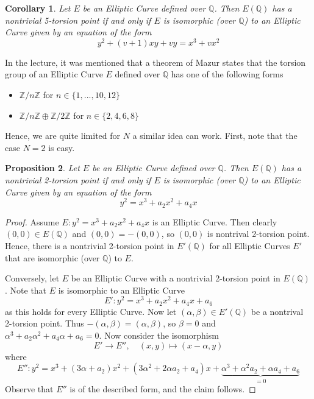 \documentclass{scrartcl}
\newcommand{\Z}{\mathbb{Z}}
\newcommand{\Q}{\mathbb{Q}}
\newtheorem{prop}{Proposition}
\newtheorem{corollary}[prop]{Corollary}
\theoremstyle{definition}
\begin{document}
\begin{corollary}
    Let $E$ be an Elliptic Curve defined over $\Q$.
    Then $E(\Q)$ has a nontrivial 5-torsion point if and only if $E$ is isomorphic (over $\Q$) to an Elliptic Curve given by an equation of the form
    \begin{equation*}
        y^2 + (v + 1)x y + v y = x^3 + v x^2
    \end{equation*}
\end{corollary}
In the lecture, it was mentioned that a theorem of Mazur states that the torsion group of an Elliptic Curve $E$ defined over $\Q$ has one of the following forms
\begin{itemize}
    \item $\Z/n\Z$ for $n \in \{ 1, ..., 10, 12 \}$
    \item $\Z/n\Z \oplus \Z/2\Z$ for $n \in \{ 2, 4, 6, 8 \}$
\end{itemize}
Hence, we are quite limited for $N$ a similar idea can work.
First, note that the case $N = 2$ is easy.
\begin{prop}
    Let $E$ be an Elliptic Curve defined over $\Q$.
    Then $E(\Q)$ has a nontrivial 2-torsion point if and only if $E$ is isomorphic (over $\Q$) to an Elliptic Curve given by an equation of the form
    \begin{equation*}
        y^2 = x^3 + a_2 x^2 + a_4 x
    \end{equation*}
\end{prop}
\begin{proof}
    Assume $E: y^2 = x^3 + a_2 x^2 + a_4 x$ is an Elliptic Curve.
    Then clearly $(0, 0) \in E(\Q)$ and $(0, 0) = -(0, 0)$, so $(0, 0)$ is nontrival 2-torsion point.
    Hence, there is a nontrivial 2-torsion point in $E'(\Q)$ for all Elliptic Curves $E'$ that are isomorphic (over $\Q$) to $E$.

    Conversely, let $E$ be an Elliptic Curve with a nontrivial 2-torsion point in $E(\Q)$.
    Note that $E$ is isomorphic to an Elliptic Curve 
    \begin{equation*}
        E': y^2 = x^3 + a_2 x^2 + a_4 x + a_6
    \end{equation*}
    as this holds for every Elliptic Curve.
    Now let $(\alpha, \beta) \in E'(\Q)$ be a nontrival 2-torsion point.
    Thus $-(\alpha, \beta) = (\alpha, \beta)$, so $\beta = 0$ and $\alpha^3 + a_2 \alpha^2 + a_4 \alpha + a_6 = 0$.
    Now consider the isomorphism
    \begin{equation*}
        E' \to E'', \quad (x, y) \mapsto (x - \alpha, y)
    \end{equation*}
    where
    \begin{equation*}
        E'': y^2 = x^3 + (3\alpha + a_2) x^2 + (3\alpha^2 + 2\alpha a_2 + a_4)x + \underbrace{\alpha^3 + \alpha^2a_2 + \alpha a_4 + a_6}_{= 0}
    \end{equation*}
    Observe that $E''$ is of the described form, and the claim follows. 
\end{proof}
\end{document}
